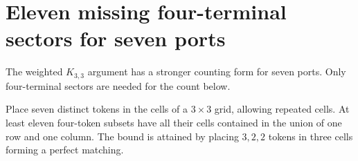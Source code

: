 \section{Eleven missing four-terminal sectors for seven ports}
\label{sec:path-seven-grid-count}

The weighted $K_{3,3}$ argument has a stronger counting form for seven ports.
Only four-terminal sectors are needed for the count below.

\begin{lemma}
\label{lem:path-seven-grid-eleven}
Place seven distinct tokens in the cells of a $3\times3$ grid, allowing repeated cells.
At least eleven four-token subsets have all their cells contained in the union of one row and one column.
The bound is attained by placing $3,2,2$ tokens in three cells forming a perfect matching.
\end{lemma}

